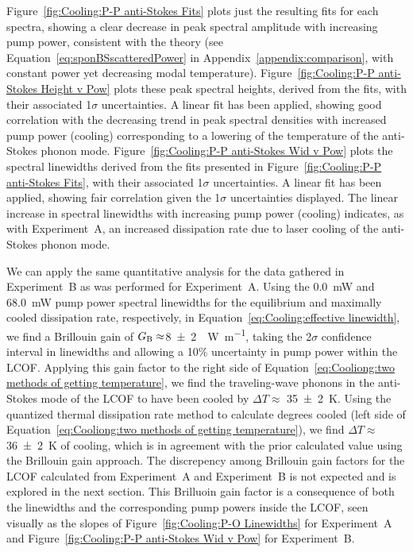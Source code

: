Figure~\ref{fig:Cooling:P-P anti-Stokes Fits} plots just the resulting fits for each spectra, showing a clear decrease in peak spectral amplitude with increasing pump power, consistent with the theory (see Equation~\ref{eq:sponBSscatteredPower} in Appendix~\ref{appendix:comparison}, with constant power yet decreasing modal temperature). Figure~\ref{fig:Cooling:P-P anti-Stokes Height v Pow} plots these peak spectral heights, derived from the fits, with their associated 1\(\sigma\) uncertainties. A linear fit has been applied, showing good correlation with the decreasing trend in peak spectral densities with increased pump power (cooling) corresponding to a lowering of the temperature of the anti-Stokes phonon mode. Figure~\ref{fig:Cooling:P-P anti-Stokes Wid v Pow} plots the spectral linewidths derived from the fits presented in Figure~\ref{fig:Cooling:P-P anti-Stokes Fits}, with their associated 1\(\sigma\) uncertainties. A linear fit has been applied, showing fair correlation given the 1\(\sigma\) uncertainties displayed. The linear increase in spectral linewidths with increasing pump power (cooling) indicates, as with Experiment~A, an increased dissipation rate due to laser cooling of the anti-Stokes phonon mode.

We can apply the same quantitative analysis for the data gathered in Experiment~B as was performed for Experiment~A. Using the \SI{0.0}{\milli\watt} and \SI{68.0}{\milli\watt} pump power spectral linewidths for the equilibrium and maximally cooled dissipation rate, respectively, in Equation~\ref{eq:Cooling:effective linewidth}, we find a Brillouin gain of \(G_{\rm B} \approx \)\SI{8(2)}{\per\watt\per\meter}, taking the 2\(\sigma\) confidence interval in linewidths and allowing a 10\% uncertainty in pump power within the \ac{LCOF}. Applying this gain factor to the right side of Equation~\ref{eq:Cooliong:two methods of getting temperature}, we find the traveling-wave phonons in the anti-Stokes mode of the \ac{LCOF} to have been cooled by \(\Delta T\approx\) \SI{35(2)}{\kelvin}. Using the quantized thermal dissipation rate method to calculate degrees cooled (left side of Equation~\ref{eq:Cooliong:two methods of getting temperature}), we find \(\Delta T \approx\)\SI{36(2)}{\kelvin} of cooling, which is in agreement with the prior calculated value using the Brillouin gain approach. The discrepency among Brillouin gain factors for the \ac{LCOF} calculated from Experiment~A and Experiment~B is not expected and is explored in the next section. This Brilluoin gain factor is a consequence of both the linewidths and the corresponding pump powers inside the \ac{LCOF}, seen visually as the slopes of Figure~\ref{fig:Cooling:P-O Linewidths} for Experiment~A and Figure~\ref{fig:Cooling:P-P anti-Stokes Wid v Pow} for Experiment~B.

